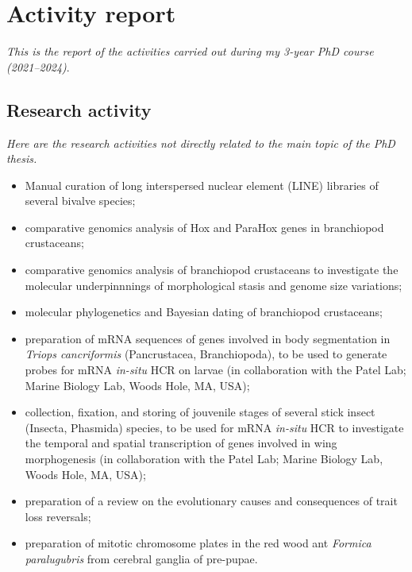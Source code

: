 {
\chapter*{Activity report}
\label{activityreport}
}

\setcounter{page}{1}

\normalsize
\textit{This is the report of the activities carried out during my 3-year PhD course (2021--2024)}.

\section*{Research activity}
\textit{Here are the research activities not directly related to the main topic of the PhD thesis.}
\begin{itemize}
    \item Manual curation of long interspersed nuclear element (LINE) libraries of several bivalve species;
    \item comparative genomics analysis of Hox and ParaHox genes in branchiopod crustaceans;
    \item comparative genomics analysis of branchiopod crustaceans to investigate the molecular underpinnnings of morphological stasis and genome size variations;
    \item molecular phylogenetics and Bayesian dating of branchiopod crustaceans;
    \item preparation of mRNA sequences of genes involved in body segmentation in \textit{Triops cancriformis} (Pancrustacea, Branchiopoda), to be used to generate probes for mRNA \textit{in-situ} HCR on larvae (in collaboration with the Patel Lab; Marine Biology Lab, Woods Hole, MA, USA);
    \item collection, fixation, and storing of jouvenile stages of several stick insect (Insecta, Phasmida) species, to be used for mRNA \textit{in-situ} HCR to investigate the temporal and spatial transcription of genes involved in wing morphogenesis (in collaboration with the Patel Lab; Marine Biology Lab, Woods Hole, MA, USA);
    \item preparation of a review on the evolutionary causes and consequences of trait loss reversals;
    \item preparation of mitotic chromosome plates in the red wood ant \textit{Formica paralugubris} from cerebral ganglia of pre-pupae.

\end{itemize}


